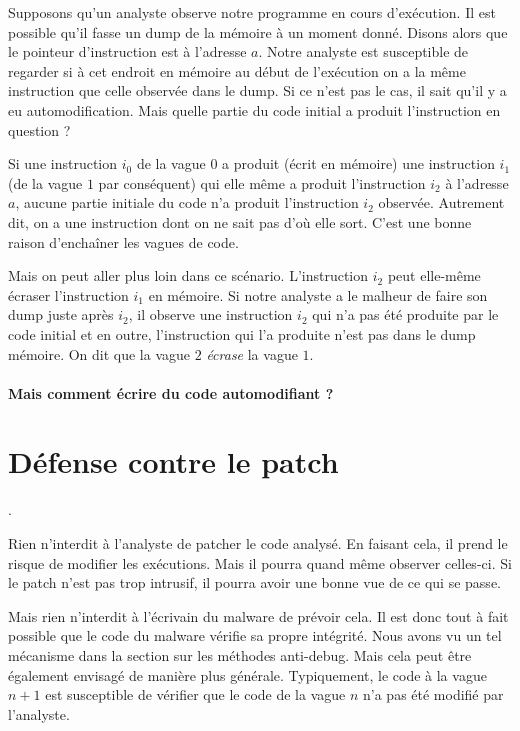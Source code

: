 \documentclass{book}
\begin{document}
Supposons qu'un analyste observe notre programme en cours d'exécution. Il est possible qu'il fasse un dump de la mémoire à un moment donné. Disons alors que le pointeur d'instruction est à l'adresse $a$. Notre analyste est susceptible de regarder si à cet endroit en mémoire au début de l'exécution on a la même instruction que celle observée dans le dump. Si ce n'est pas le cas, il sait qu'il y a eu automodification. Mais quelle partie du code initial a produit l'instruction en question ?

Si une instruction $i_0$ de la vague $0$ a produit (écrit en mémoire) une instruction $i_1$ (de la vague $1$ par conséquent) qui elle même a produit l'instruction $i_2$  à l'adresse $a$, aucune partie initiale du code n'a produit l'instruction $i_2$ observée. Autrement dit, on a une instruction dont on ne sait pas d'où elle sort.  C'est une bonne raison d'enchaîner les vagues de code.

Mais on peut aller plus loin dans ce scénario. L'instruction $i_2$ peut elle-même écraser l'instruction $i_1$ en mémoire. Si notre analyste a le malheur de faire son dump juste après $i_2$, il observe une instruction $i_2$ qui n'a pas été produite par le code initial et en outre, l'instruction qui l'a produite n'est pas dans le dump mémoire. On dit que la vague $2$ \emph{écrase} la vague $1$.


\paragraph{Mais comment écrire du code automodifiant ?}




\section{Défense contre le patch}. 

Rien n'interdit à l'analyste de patcher le code analysé. En faisant cela, il prend le risque de modifier  les exécutions. Mais il pourra quand même observer celles-ci. Si le patch n'est pas trop intrusif, il pourra avoir une bonne vue de ce qui se passe. 

Mais rien n'interdit à l'écrivain du malware de prévoir cela. Il est donc tout à fait possible que le code du malware vérifie sa propre intégrité. Nous avons vu un tel mécanisme dans la section sur les méthodes anti-debug. Mais cela peut être également envisagé de manière plus générale.  Typiquement, le code à la vague $n+1$ est susceptible de vérifier que le code de la vague $n$ n'a pas été modifié par l'analyste.
\end{document}
